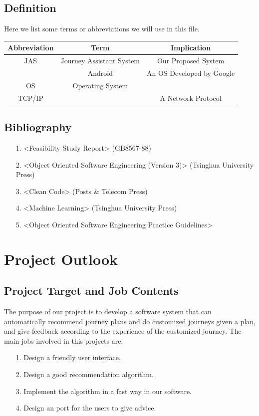 \documentclass[10pt]{article}
\begin{document}
\subsection{Definition}
Here we list some terms or abbreviations we will use in this file.

\begin{center}
\begin{tabular}{|c|c|c|} 
	\hline 
	Abbreviation&Term&Implication\\
	\hline  
	JAS&Journey Assistant System&Our Proposed System\\
	\hline 
	 &Android&An OS Developed by Google\\
	\hline
	OS&Operating System& \\
	\hline
	TCP/IP& &A Network Protocol\\
	\hline
\end{tabular}    
\end{center}

\subsection{Bibliography}
\begin{itemize}
	\item[1.] <Feasibility Study Report> (GB8567-88)
	\item[2.] <Object Oriented Software Engineering (Version 3)> (Tsinghua University Press)
	\item[3.] <Clean Code> (Posts \& Telecom Press)
	\item[4.] <Machine Learning> (Tsinghua University Press)
	\item[5.] <Object Oriented Software Engineering Practice Guidelines> 
\end{itemize}

\section{Project Outlook}
\subsection{Project Target and Job Contents}
The purpose of our project is to develop a software system that can automatically recommend journey plans and do customized journeys given a plan, and give feedback according to the experience of the customized journey. The main jobs involved in this projects are:

\begin{itemize}
	\item[1.] Design a friendly user interface.
	\item[2.] Design a good recommendation algorithm.
	\item[3.] Implement the algorithm in a fast way in our software.
	\item[4.] Design an port for the users to give advice.
\end{itemize}
\end{document}
